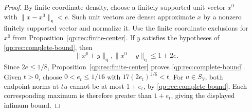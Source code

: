 \begin{proof}
By finite-coordinate density, choose a finitely supported unit vector
\(x^0\) with \(\|x-x^0\|_{\mathrm q}<e\).  Such unit vectors are
dense: approximate \(x\) by a nonzero finitely supported vector and
normalize it.  Use the finite coordinate exclusions for \(x^0\) from
Proposition~\ref{qp:rec:finite-center}.  If \(y\) satisfies the
hypotheses of \eqref{qp:rec:complete-bound}, then
\[
 \|x^0+y\|_{\mathrm q},\|x^0-y\|_{\mathrm q}\le1+2e.
\]
Since \(2e\le1/8\), Proposition~\ref{qp:rec:finite-center} proves
\eqref{qp:rec:complete-bound}.  Given \(t>0\), choose
\(0<e_t\le1/16\) with \(17(2e_t)^{1/6}<t\).
For \(u\in S_Y\), both endpoint norms at \(tu\) cannot be at most
\(1+e_t\), by \eqref{qp:rec:complete-bound}.  Each corresponding
maximum is therefore greater than \(1+e_t\), giving the displayed
infimum bound.
\end{proof}
